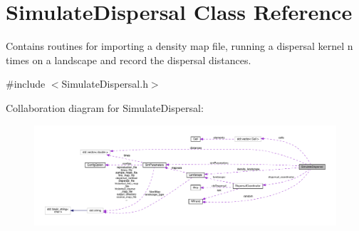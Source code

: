 \hypertarget{class_simulate_dispersal}{}\section{Simulate\+Dispersal Class Reference}
\label{class_simulate_dispersal}


Contains routines for importing a density map file, running a dispersal kernel n times on a landscape and record the dispersal distances.  




{\ttfamily \#include $<$Simulate\+Dispersal.\+h$>$}



Collaboration diagram for Simulate\+Dispersal\+:\nopagebreak
\begin{figure}[H]
\begin{center}
\leavevmode
\includegraphics[width=350pt]{class_simulate_dispersal__coll__graph}
\end{center}
\end{figure}
